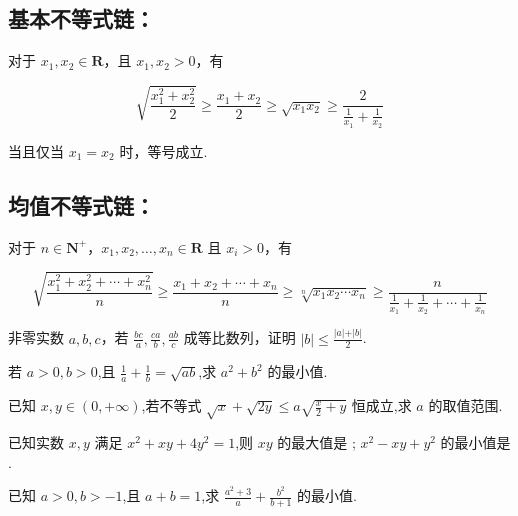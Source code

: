 \documentclass[a4paper , final]{ctexart}
\newenvironment{problem}[1]{%
  \item #1
  \par
  \vspace{8cm}
}{}
\begin{document}
\subsection*{基本不等式链：}

对于 $x_1,x_2\in\mathbf{R}$，且 $x_1,x_2>0$，有

$$
\sqrt{\frac{x_1^2+x_2^2}{2}}\geq \frac{x_1+x_2}{2} \geq \sqrt{x_1x_2} \geq\frac{2}{\frac{1}{x_1}+\frac{1}{x_2}} 
$$

当且仅当 $x_1=x_2$ 时，等号成立.

\subsection*{均值不等式链：}

对于 $n\in\mathbf{N}^+$，$x_1,x_2,\ldots,x_n\in\mathbf{R}$ 且 $x_i>0$，有

$$
\sqrt{\frac{x_1^2+x_2^2+\cdots+x_n^2}{n}} \geq \frac{x_1+x_2+\cdots+x_n}{n} \geq \sqrt[n]{x_1x_2\cdots x_n}\geq \frac{n}{\frac{1}{x_1}+\frac{1}{x_2}+\cdots+\frac{1}{x_n}}
$$

\begin{problems}
  \begin{problem}
    {
      非零实数 $a,b,c$，若 $\frac{bc}{a},\frac{ca}{b},\frac{ab}{c}$ 成等比数列，证明 $\vert b\vert\leq \frac{\vert a \vert +\vert b\vert}{2}$.
    }
  \end{problem}

  \begin{problem}
    {
      若 $a>0,b>0$,且 $\frac{1}{a}+\frac{1}{b} =\sqrt{ab}$,求 $a^2+b^2$ 的最小值.
    }
  \end{problem}

  \begin{problem}
    {
      已知 $x,y\in(0,+\infty)$,若不等式 $\sqrt{x}+\sqrt{2y}\leq a\sqrt{\frac{x}{2}+y}$ 恒成立,求 $a$ 的取值范围.
    }
  \end{problem}

  \begin{problem}
    {
      已知实数 $x,y$ 满足 $x^2+xy+4y^2=1$,则 $xy$ 的最大值是 \underline{\hspace{2cm}}; $x^2-xy+y^2$ 的最小值是 \underline{\hspace{2cm}}.
    }
  \end{problem}

  \begin{problem}
    {
      已知 $a>0,b>-1$,且 $a+b=1$,求 $\frac{a^2+3}{a}+\frac{b^2}{b+1}$ 的最小值.
    }
  \end{problem}
\end{problems}
\end{document}
